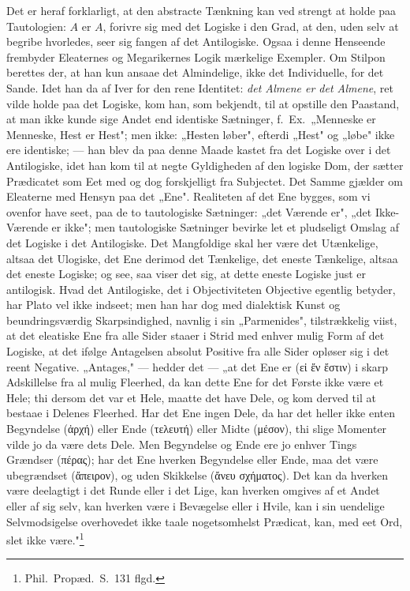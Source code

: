 \documentclass[12pt]{book}
\newcommand{\opage}[1]{\marginnote{\footnotesize\textit{[#1]}}}
\begin{document}
Det er heraf forklarligt, at den abstracte Tænkning kan ved strengt at holde paa Tautologien:
$A$ er $A$, forivre sig med det Logiske i den Grad, at den, uden selv at begribe hvorledes, seer
sig fangen af det Antilogiske. Ogsaa i denne Henseende frembyder Eleaternes og Megarikernes
Logik mærkelige Exempler. Om Stilpon berettes der, at han kun ansaae det Almindelige, ikke det
Individuelle, for det Sande. Idet han da af Iver for den rene Identitet: \emph{det Almene er
det Almene}, ret vilde holde paa det Logiske, kom han, som bekjendt, til at opstille den
Paastand, at man ikke kunde sige Andet end identiske Sætninger, f.\ Ex.\ „Menneske er
Menneske, Hest er Hest"; men ikke: „Hesten løber", efterdi „Hest" og „løbe" ikke ere
identiske; --- han blev da paa denne Maade kastet fra det Logiske over i det Antilogiske, idet
han kom til at negte Gyldigheden af den logiske Dom, der sætter Prædicatet som Eet med og dog
forskjelligt fra Subjectet. Det Samme gjælder om Eleaterne med Hensyn paa det „Ene".
Realiteten af det Ene bygges, som vi ovenfor have seet, paa de to tautologiske Sætninger: „det
Værende er", „det Ikke-Værende er ikke"; men tautologiske Sætninger bevirke let et pludseligt
Omslag af det Logiske i det Antilogiske. Det
\opage{157} Mangfoldige skal her være det Utænkelige, altsaa det Ulogiske, det Ene derimod det Tænkelige,
det eneste Tænkelige, altsaa det eneste Logiske; og see, saa viser det sig, at dette eneste
Logiske just er antilogisk. Hvad det Antilogiske, det i Objectiviteten Objective egentlig
betyder, har Plato vel ikke indseet; men han har dog med dialektisk Kunst og
beundringsværdig Skarpsindighed, navnlig i sin „Parmenides", tilstrækkelig viist, at det
eleatiske Ene fra alle Sider staaer i Strid med enhver mulig Form af det Logiske, at det ifølge
Antagelsen absolut Positive fra alle Sider opløser sig i det reent Negative. „Antages," ---
hedder det --- „at det Ene er (εἰ ἔν ἔστιν) i skarp Adskillelse fra al mulig Fleerhed, da kan
dette Ene for det Første ikke være et Hele; thi dersom det var et Hele, maatte det have Dele,
og kom derved til at bestaae i Delenes Fleerhed. Har det Ene ingen Dele, da har det heller ikke
enten Begyndelse (ἀρχή) eller Ende (τελευτή) eller Midte (μέσον), thi slige Momenter vilde jo da
være dets Dele. Men Begyndelse og Ende ere jo enhver Tings Grændser (πέρας); har det Ene
hverken Begyndelse eller Ende, maa det være ubegrændset (ἄπειρον), og uden Skikkelse (ἄνευ
σχήματος). Det kan da hverken være deelagtigt i det Runde eller i det Lige, kan hverken omgives
af et Andet eller af sig selv, kan hverken være i Bevægelse eller i Hvile, kan i sin uendelige
Selvmodsigelse overhovedet ikke taale nogetsomhelst Prædicat, kan, med eet Ord, slet ikke
være."\footnote{Phil.\ Propæd.\ S.~131 flgd.}
\end{document}
